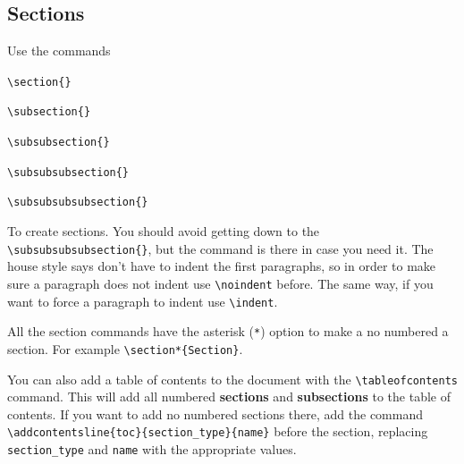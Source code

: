\documentclass[headers1]{MSEHouseStyle}
\begin{document}
\subsection{Sections}
\noindent
Use the commands \par
\verb|\section{}| \par
\verb|\subsection{}| \par
\verb|\subsubsection{}| \par
\verb|\subsubsubsection{}| \par
\verb|\subsubsubsubsection{}| \par
\noindent
To create sections. You should avoid getting down to the \verb|\subsubsubsubsection{}|, but the command is there in case you need it. The house style says don't have to indent the first paragraphs, so in order to make sure a paragraph does not indent use \verb|\noindent| before. The same way, if you want to force a paragraph to indent use \verb|\indent|. \par
All the section commands have the asterisk (\texttt{*}) option to make a no numbered a section. For example \verb|\section*{Section}|. \par
You can also add a table of contents to the document with the \verb|\tableofcontents| command. This will add all numbered \textbf{sections} and \textbf{subsections} to the table of contents. If you want to add no numbered sections there, add the command \verb|\addcontentsline{toc}{section_type}{name}| before the section, replacing \verb|section_type| and \verb|name| with the appropriate values.
\end{document}

